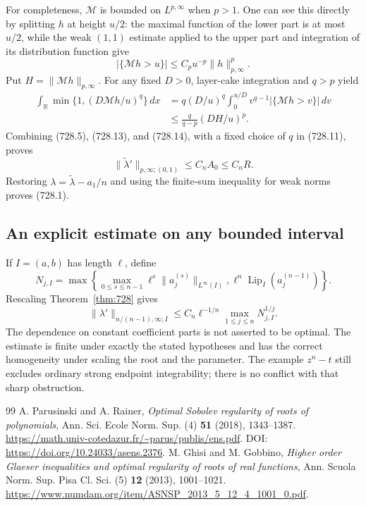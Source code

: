 \documentclass[11pt,a4paper]{article}
\theoremstyle{remark}
\begin{document}
For completeness, $\mathcal M$ is bounded on $L^{p,\infty}$ when $p>1$.
One can see this directly by splitting $h$ at height $u/2$: the maximal
function of the lower part is at most $u/2$, while the weak $(1,1)$ estimate
applied to the upper part and integration of its distribution function
 give
\[
 |\{\mathcal Mh>u\}|\le C_p u^{-p}\|h\|_{p,\infty}^p.
\]
Put $H=\|\mathcal Mh\|_{p,\infty}$.  For any fixed $D>0$, layer-cake
integration and $q>p$ yield
\[
 \begin{split}
 \int_{\mathbb R}\min\{1,(D\mathcal Mh/u)^q\}\,dx
 &=q(D/u)^q\int_0^{u/D}
                v^{q-1}|\{\mathcal Mh>v\}|\,dv\\
 &\le\frac{q}{q-p}(DH/u)^p.
 \end{split}
 \tag{728.14}
\]
Combining (728.5), (728.13), and (728.14), with a fixed choice of $q$ in
(728.11), proves
\[
 \|\widetilde\lambda'\|_{p,\infty;(0,1)}\le C_nA_0\le C_nR.
\]
Restoring $\lambda=\widetilde\lambda-a_1/n$ and using the finite-sum
inequality for weak norms proves (728.1).

\subsection{An explicit estimate on any bounded interval}

If $I=(a,b)$ has length $\ell$, define
\[
 N_{j,I}=\max\left\{
      \max_{0\le s\le n-1}\ell^s\|a_j^{(s)}\|_{L^\infty(I)},
      \ell^n\operatorname{Lip}_I(a_j^{(n-1)})\right\}.
\]
Rescaling Theorem~\ref{thm:728} gives
\[
 \boxed{\quad
 \|\lambda'\|_{n/(n-1),\infty;I}
       \le C_n\ell^{-1/n}\max_{1\le j\le n}N_{j,I}^{1/j}.
 \quad}
 \tag{728.15}
\]
The dependence on constant coefficient parts is not asserted to be
optimal.  The estimate is finite under exactly the stated hypotheses and
has the correct homogeneity under scaling the root and the parameter.
The example $z^n-t$ still excludes ordinary strong endpoint integrability;
there is no conflict with that sharp obstruction.

\begingroup\small
\begin{thebibliography}{99}
 A. Parusinski and A. Rainer, \emph{Optimal Sobolev regularity of roots of polynomials}, Ann. Sci. Ecole Norm. Sup. (4) \textbf{51} (2018), 1343--1387. \url{https://math.univ-cotedazur.fr/~parus/publis/ens.pdf}. DOI: \url{https://doi.org/10.24033/asens.2376}.
 M. Ghisi and M. Gobbino, \emph{Higher order Glaeser inequalities and optimal regularity of roots of real functions}, Ann. Scuola Norm. Sup. Pisa Cl. Sci. (5) \textbf{12} (2013), 1001--1021. \url{https://www.numdam.org/item/ASNSP_2013_5_12_4_1001_0.pdf}.
\end{thebibliography}
\endgroup
\end{document}
